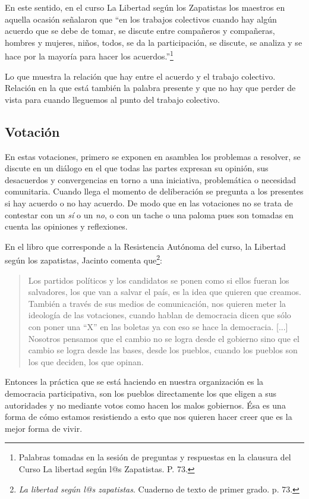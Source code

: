 \documentclass[oneside]{book}
\begin{document}
En este sentido, en el curso La Libertad según los Zapatistas los maestros en aquella ocasión señalaron que “en los trabajos colectivos cuando hay algún acuerdo que se debe de tomar, se discute entre compañeros y compañeras, hombres y mujeres, niños, todos, se da la participación, se discute, se analiza y se hace por la mayoría para hacer los acuerdos.”\footnote{Palabras tomadas en la sesión de preguntas y respuestas en la clausura del Curso La libertad según l@s Zapatistas. P. 73.}

Lo que muestra la relación que hay entre el acuerdo y el trabajo colectivo. Relación en la que está también la palabra presente y que no hay que perder de vista para cuando lleguemos al punto del trabajo colectivo.

\subsection{Votación}

En estas votaciones, primero se exponen en asamblea los problemas a resolver, se discute en un diálogo en el que todas las partes expresan su opinión, sus desacuerdos y convergencias en torno a una iniciativa, problemática o necesidad comunitaria. Cuando llega el momento de deliberación se pregunta a los presentes si hay acuerdo o no hay acuerdo. De modo que en las votaciones no se trata de contestar con un \textit{sí} o un \textit{no}, o con un tache o una paloma pues son tomadas en cuenta las opiniones y reflexiones.

En el libro que corresponde a la Resistencia Autónoma del curso, la Libertad según los zapatistas, Jacinto comenta que\footnote{\textit{La libertad según l@s zapatistas}. Cuaderno de texto de primer grado. p. 73.}:
\begin{quote}
Los partidos políticos y los candidatos se ponen como si ellos fueran los salvadores, los que van a salvar el país, es la idea que quieren que creamos. También a través de sus medios de comunicación, nos quieren meter la ideología de las votaciones, cuando hablan de democracia dicen que sólo con poner una “X” en las boletas ya con eso se hace la democracia.
[...]
Nosotros pensamos que el cambio no se logra desde el gobierno sino que el cambio se logra desde las bases, desde los pueblos, cuando los pueblos son los que deciden, los que opinan.
\end{quote}
Entonces la práctica que se está haciendo en nuestra organización es la democracia participativa, son los pueblos directamente los que eligen a sus autoridades y no mediante votos como hacen los malos gobiernos. Ésa es una forma de cómo estamos resistiendo a esto que nos quieren hacer creer que es la mejor forma de vivir. 
\end{document}
